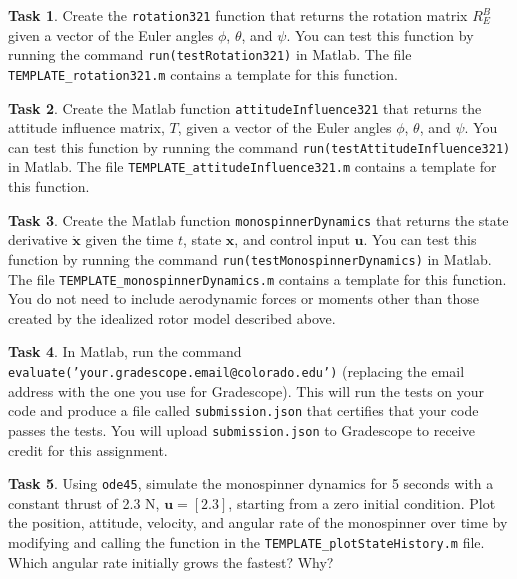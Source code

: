 \documentclass{article}
\theoremstyle{definition}
\newtheorem{task}{Task}
\begin{document}
\begin{task}
    Create the \texttt{rotation321} function that returns the rotation matrix $R^B_E$ given a vector of the Euler angles $\phi$, $\theta$, and $\psi$. You can test this function by running the command \texttt{run(testRotation321)} in Matlab. The file \texttt{TEMPLATE\_rotation321.m} contains a template for this function.
\end{task}

\begin{task}
    Create the Matlab function \texttt{attitudeInfluence321} that returns the attitude influence matrix, $T$, given a vector of the Euler angles $\phi$, $\theta$, and $\psi$. You can test this function by running the command \texttt{run(testAttitudeInfluence321)} in Matlab. The file \texttt{TEMPLATE\_attitudeInfluence321.m} contains a template for this function.
\end{task}

\begin{task}
    Create the Matlab function \texttt{monospinnerDynamics} that returns the state derivative $\dot{\textbf{x}}$ given the time $t$, state $\textbf{x}$, and control input $\textbf{u}$. You can test this function by running the command \texttt{run(testMonospinnerDynamics)} in Matlab. The file \texttt{TEMPLATE\_monospinnerDynamics.m} contains a template for this function. You do not need to include aerodynamic forces or moments other than those created by the idealized rotor model described above.
\end{task}

\begin{task}
    In Matlab, run the command \texttt{evaluate('your.gradescope.email@colorado.edu')} (replacing the email address with the one you use for Gradescope). This will run the tests on your code and produce a file called \texttt{submission.json} that certifies that your code passes the tests. You will upload \texttt{submission.json} to Gradescope to receive credit for this assignment.
\end{task}

\begin{task}\label{task:powered}
    Using \texttt{ode45}, simulate the monospinner dynamics for 5 seconds with a constant thrust of 2.3 N, $\textbf{u}=[2.3]$, starting from a zero initial condition. Plot the position, attitude, velocity, and angular rate of the monospinner over time by modifying and calling the function in the \texttt{TEMPLATE\_plotStateHistory.m} file. Which angular rate initially grows the fastest? Why?
\end{task}
\end{document}
